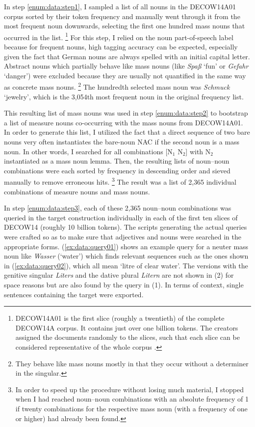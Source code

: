 \documentclass[USenglish]{article}
\newcommand{\Sub}[1]{\ensuremath{\mathrm{_{#1}}}}
\begin{document}
In step \ref{enum:data:step1}, I sampled a list of all nouns in the DECOW14A01 corpus sorted by their token frequency and manually went through it from the most frequent noun downwards, selecting the first one hundred mass nouns that occurred in the list.%
\footnote{DECOW14A01 is the first slice (roughly a twentieth) of the complete DECOW14A corpus.
It contains just over one billion tokens.
The creators assigned the documents randomly to the slices, such that each slice can be considered representative of the whole corpus \cite{Schaefer2015b}.}
For this step, I relied on the noun part-of-speech label because for frequent nouns, high tagging accuracy can be expected, especially given the fact that German nouns are always spelled with an initial capital letter.
Abstract nouns which partially behave like mass nouns (like \textit{Spaß} `fun’ or \textit{Gefahr} `danger’) were excluded because they are usually not quantified in the same way as concrete mass nouns.%
\footnote{They behave like mass nouns mostly in that they occur without a determiner in the singular.}
The hundredth selected mass noun was \textit{Schmuck} `jewelry’, which is the 3,054th most frequent noun in the original frequency list.

This resulting list of mass nouns was used in step \ref{enum:data:step2} to bootstrap a list of measure nouns co-occurring with the mass nouns from DECOW14A01.
In order to generate this list, I utilized the fact that a direct sequence of two bare nouns very often instantiates the bare-noun NAC if the second noun is a mass noun.
In other words, I searched for all combinations [N\Sub{1} N\Sub{2}] with N\Sub{2} instantiated as a mass noun lemma.
Then, the resulting lists of noun--noun combinations were each sorted by frequency in descending order and sieved manually to remove erroneous hits.%
\footnote{In order to speed up the procedure without losing much material, I stopped when I had reached noun–noun combinations with an absolute frequency of 1 if twenty combinations for the respective mass noun (with a frequency of one or higher) had already been found.}
The result was a list of 2,365 individual combinations of measure nouns and mass nouns.

In step \ref{enum:data:step3}, each of these 2,365 noun–noun combinations was queried in the target construction individually in each of the first ten slices of DECOW14 (roughly 10 billion tokens).
The scripts generating the actual queries were crafted so as to make sure that adjectives and nouns were searched in the appropriate forms.
(\ref{ex:data:query01}) shows an example query for a neuter mass noun like \textit{Wasser} (`water’) which finds relevant sequences such as the ones shown in (\ref{ex:data:query02}), which all mean `litre of clear water’.
The versions with the genitive singular \textit{Liters} and the dative plural \textit{Litern} are not shown in (2) for space reasons but are also found by the query in (1).
In terms of context, single sentences containing the target were exported.
\end{document}
